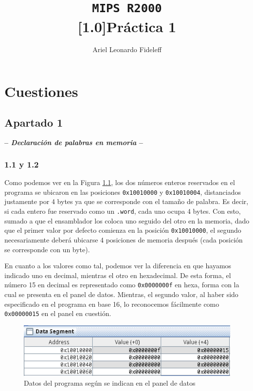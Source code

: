\documentclass[a4paper]{report}
\title{\Huge{}\texttt{MIPS R2000}\\\vspace{8pt}\Large{}\textbf{\scalebox{.85}[1.0]{Práctica 1}}}
\author{Ariel Leonardo Fideleff}
\begin{document}
\maketitle

\chapter{Cuestiones}

\section{Apartado 1}

\begin{center}
\large\textbf{-- \textsl{Declaración de palabras en memoria} --}
\end{center}

\subsection*{1.1 y 1.2}

Como podemos ver en la Figura \ref{fig:c1-1}, los dos números enteros reservados en el programa se ubicaron en las posiciones \texttt{0x10010000} y \texttt{0x10010004}, distanciados justamente por 4 bytes ya que se corresponde con el tamaño de palabra. Es decir, si cada entero fue reservado como un \texttt{.word}, cada uno ocupa 4 bytes. Con esto, sumado a que el ensamblador los coloca uno seguido del otro en la memoria, dado que el primer valor por defecto comienza en la posición \texttt{0x10010000}, el segundo necesariamente deberá ubicarse 4 posiciones de memoria después (cada posición se corresponde con un byte).

En cuanto a los valores como tal, podemos ver la diferencia en que hayamos indicado uno en decimal, mientras el otro en hexadecimal. De esta forma, el número 15 en decimal es representado como \texttt{0x0000000f} en hexa, forma con la cual se presenta en el panel de datos. Mientras, el segundo valor, al haber sido especificado en el programa en base 16, lo reconocemos fácilmente como \texttt{0x00000015} en el panel en cuestión.

\begin{figure}[h]
    \centering
    \includegraphics[width=.6\linewidth]{img/c1-1}
    \caption{Datos del programa según se indican en el panel de datos}
    \label{fig:c1-1}
\end{figure}
\end{document}
